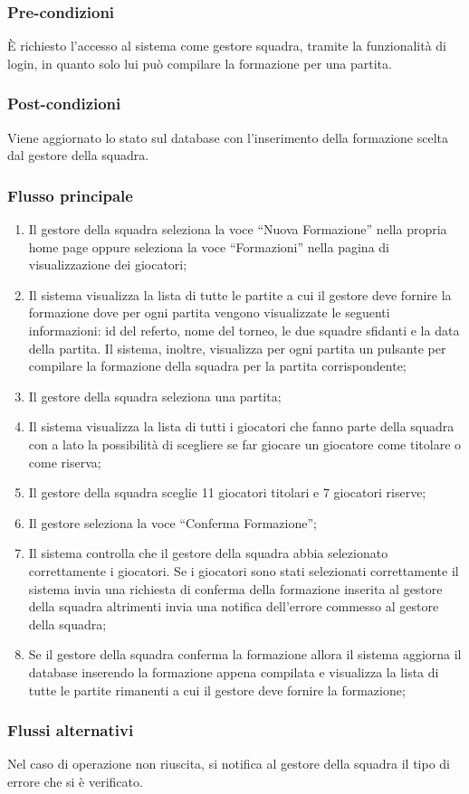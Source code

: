 \subsubsection*{Pre-condizioni}
È richiesto l'accesso al sistema come gestore squadra, tramite la funzionalità di login, in quanto solo lui può compilare la formazione per una partita.

\subsubsection*{Post-condizioni}
Viene aggiornato lo stato sul database con l'inserimento della formazione scelta dal gestore della squadra.

\subsubsection*{Flusso principale}

\begin{enumerate}
	
	\item
	Il gestore della squadra seleziona la voce ``Nuova Formazione'' nella propria home page oppure seleziona la voce ``Formazioni'' nella pagina di visualizzazione dei giocatori;
	
	\item
	Il sistema visualizza la lista di tutte le partite a cui il gestore deve fornire la formazione dove per ogni partita vengono visualizzate le seguenti informazioni: id del referto, nome del torneo, le due squadre sfidanti e la data della partita. Il sistema, inoltre, visualizza per ogni partita un pulsante per compilare la formazione della squadra per la partita corrispondente;
	
	\item
	Il gestore della squadra seleziona una partita;
	
	\item
	Il sistema visualizza la lista di tutti i giocatori che fanno parte della squadra con a lato la possibilità di scegliere se far giocare un giocatore come titolare o come riserva;
	
	\item
	Il gestore della squadra sceglie 11 giocatori titolari e 7 giocatori riserve;
	
	\item
	Il gestore seleziona la voce ``Conferma Formazione'';
	
	\item
	Il sistema controlla che il gestore della squadra abbia selezionato correttamente i giocatori. Se i giocatori sono stati selezionati correttamente il sistema invia una richiesta di conferma della formazione inserita al gestore della squadra altrimenti invia una notifica dell'errore commesso al gestore della squadra;
	
	\item
	Se il gestore della squadra conferma la formazione allora il sistema aggiorna il database inserendo la formazione appena compilata e visualizza la lista di tutte le partite rimanenti a cui il gestore deve fornire la formazione;
	
\end{enumerate}

\subsubsection*{Flussi alternativi}
Nel caso di operazione non riuscita, si notifica al gestore della squadra il tipo di errore che si è verificato.